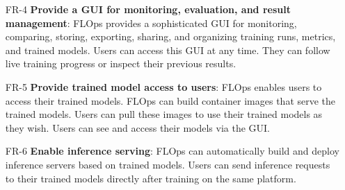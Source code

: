 \begin{itemize}
    \item [FR-4] {\textbf{Provide a GUI for monitoring, evaluation, and result management}}: \label{FR-4}
        FLOps provides a sophisticated GUI for monitoring, comparing, storing, exporting, sharing, and organizing training runs, metrics, and trained models.
        Users can access this GUI at any time.
        They can follow live training progress or inspect their previous results.
    \item [FR-5] {\textbf{Provide trained model access to users}}: \label{FR-5}
        FLOps enables users to access their trained models.
        FLOps can build container images that serve the trained models.
        Users can pull these images to use their trained models as they wish.
        Users can see and access their models via the GUI.
    \item [FR-6] {\textbf{Enable inference serving}}: \label{FR-6}
        FLOps can automatically build and deploy inference servers based on trained models.
        Users can send inference requests to their trained models directly after training on the same platform.
\end{itemize}